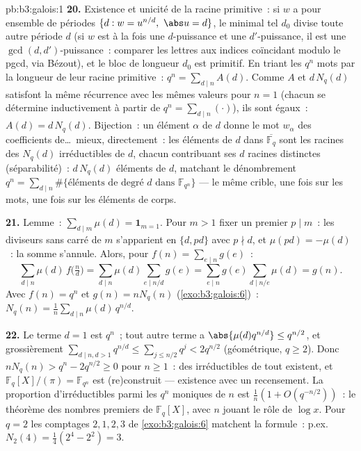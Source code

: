 \begin{solution}{pb:b3:galois:1}
\textbf{20.} Existence et unicité de la racine primitive~: si
$w$ a pour ensemble de périodes $\{d : w = u^{n/d},\ \abs u =
d\}$, le minimal tel $d_0$ divise toute autre période $d$ (si
$w$ est à la fois une $d$-puissance et une $d'$-puissance, il
est une $\gcd(d, d')$-puissance~: comparer les lettres aux
indices coïncidant modulo le pgcd, via Bézout), et le bloc de
longueur $d_0$ est primitif. En triant les $q^n$ mots par la
longueur de leur racine primitive~: $q^n = \sum_{d \mid
n}A(d)$. Comme $A$ et $d\,N_q(d)$ satisfont la même récurrence
avec les mêmes valeurs pour $n = 1$ (chacun se détermine
inductivement à partir de $q^n = \sum_{d\mid n}(\cdot)$), ils
sont égaux~: $A(d) = d\,N_q(d)$. Bijection~: un élément
$\alpha$ de  $d$ donne le mot $w_\alpha$ des
coefficients de\dots\ mieux, directement~: les éléments de
 $d$ dans $\overline{\mathbb F_q}$ sont les racines des
$N_q(d)$ irréductibles de  $d$, chacun contribuant ses
$d$ racines distinctes (séparabilité)~: $d\,N_q(d)$ éléments
de  $d$, matchant le dénombrement $q^n =
\sum_{d\mid n}\#\{\text{éléments de degré } d \text{ dans }
\mathbb F_{q^n}\}$ --- le même crible, une fois sur les mots,
une fois sur les éléments de corps.

\textbf{21.} Lemme~: $\sum_{d \mid m}\mu(d) = \mathbf
1_{m=1}$. Pour $m > 1$ fixer un premier $p \mid m$~: les
diviseurs sans carré de $m$ s'apparient en $\{d, pd\}$ avec $p
\nmid d$, et $\mu(pd) = -\mu(d)$~: la somme s'annule. Alors,
pour $f(n) = \sum_{e\mid n}g(e)$~:
\[
\sum_{d \mid n}\mu(d)\,f\bigl(\tfrac nd\bigr)
= \sum_{d \mid n}\mu(d)\!\!\sum_{e \mid n/d}\!\!g(e)
= \sum_{e \mid n}g(e)\!\!\sum_{d \mid n/e}\!\!\mu(d)
= g(n) .
\]
Avec $f(n) = q^n$ et $g(n) = nN_q(n)$
(\cref{exo:b3:galois:6})~: $N_q(n) =
\frac1n\sum_{d\mid n}\mu(d)\,q^{n/d}$.

\textbf{22.} Le terme $d = 1$ est $q^n$~; tout autre terme a
$\abs{\mu(d)q^{n/d}} \leq q^{n/2}$, et grossièrement
$\sum_{d \mid n, d > 1}q^{n/d} \leq \sum_{j \leq
n/2}q^j < 2q^{n/2}$ (géométrique, $q \geq 2$). Donc $nN_q(n)
> q^n - 2q^{n/2} \geq 0$ pour $n \geq 1$~: des irréductibles
de tout  existent, et $\mathbb F_q[X]/(\pi) = \mathbb
F_{q^n}$ est (re)construit --- existence avec un recensement.
La proportion d'irréductibles parmi les $q^n$ moniques de
 $n$ est $\frac1n(1 + O(q^{-n/2}))$~: le théorème des
nombres premiers de $\mathbb F_q[X]$, avec $n$ jouant le rôle
de $\log x$. Pour $q = 2$ les comptages $2, 1, 2, 3$ de
\cref{exo:b3:galois:6} matchent la formule~: p.ex.\ $N_2(4) =
\frac14(2^4 - 2^2) = 3$.


\end{solution}
